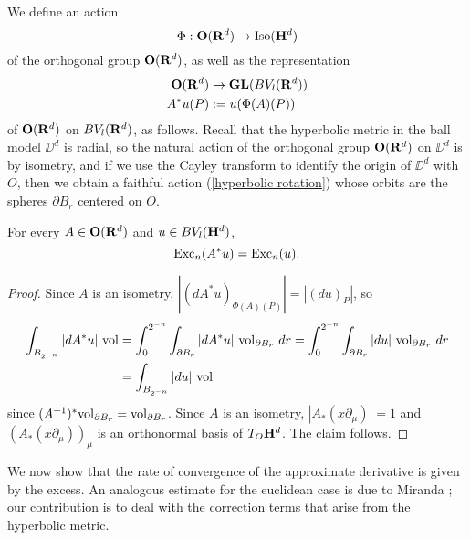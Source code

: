 \begin{notation}
We define an action
\begin{equation}\label{hyperbolic rotation}
    \Phi: \mathbf{O}(\mathbf{R}^d) \to \operatorname{Iso}(\mathbf H^d)
\end{equation}
of the orthogonal group $\mathbf{O}(\mathbf{R}^d)$, as well as the representation
\begin{align*}
\mathbf{O}(\mathbf{R}^d) &\to \mathbf{GL}(BV_l(\mathbf{R}^d))\\
A^* u(P) &:= u(\Phi(A)(P))
\end{align*}
of $\mathbf{O}(\mathbf{R}^d)$ on $BV_l(\mathbf{R}^d)$, as follows.
Recall that the hyperbolic metric in the ball model $\DD^d$ is radial, so the natural action of the orthogonal group $\mathbf{O}(\mathbf{R}^d)$ on $\DD^d$ is by isometry, and if we use the Cayley transform to identify the origin of $\DD^d$ with $O$, then we obtain a faithful action (\ref{hyperbolic rotation}) whose orbits are the spheres $\partial B_r$ centered on $O$.
\end{notation}

\begin{lemma}\label{excess rotation invariant}
For every $A \in \mathbf{O}(\mathbf{R}^d)$ and $u \in BV_l(\mathbf H^d)$,
$$\operatorname{Exc}_n(A^* u) = \operatorname{Exc}_n(u).$$
\end{lemma}
\begin{proof}
Since $A$ is an isometry, $|(d A^* u)_{\Phi(A)(P)}| = |(du)_P|$, so
\begin{align*}
\int_{B_{2^{-n}}} |dA^*u| ~\mathrm{vol} &= \int_0^{2^{-n}} \int_{\partial B_r} |dA^* u| ~\mathrm{vol}_{\partial B_r} ~dr = \int_0^{2^{-n}} \int_{\partial B_r} |du| ~\mathrm{vol}_{\partial B_r} ~dr\\
&= \int_{B_{2^{-n}}} |du| ~\mathrm{vol}
\end{align*}
since $(A^{-1})^* \mathrm{vol}_{\partial B_r} = \mathrm{vol}_{\partial B_r}$.
Since $A$ is an isometry, $|A_* (x \partial_\mu)| = 1$ and $(A_*(x \partial_\mu))_\mu$ is an orthonormal basis of $T_O \mathbf H^d$.
The claim follows.
\end{proof}

We now show that the rate of convergence of the approximate derivative is given by the excess.
An analogous estimate for the euclidean case is due to Miranda \cite[pg661]{Miranda66}; our contribution is to deal with the correction terms that arise from the hyperbolic metric.

